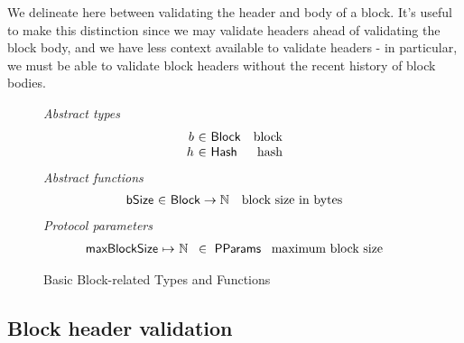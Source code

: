 \documentclass[11pt,a4paper]{article}
\newcommand{\fun}[1]{\mathsf{#1}}
\newcommand{\type}[1]{\mathsf{#1}}
\newcommand{\totalf}{\to}
\newcommand{\partialf}{\mapsto}
\newcommand{\Hash}{\type{Hash}}  %
\newcommand{\Block}{\type{Block}}
\newcommand{\ProtParams}{\type{PParams}} %
\newcommand{\bsizename}{bSize}
\begin{document}
We delineate here between validating the header and body of a block. It's useful
to make this distinction since we may validate headers ahead of validating the
block body, and we have less context available to validate headers - in
particular, we must be able to validate block headers without the recent history
of block bodies.

\begin{figure}[ht]
  \emph{Abstract types}
  \begin{equation*}
    \begin{array}{r@{~\in~}lr}
    b & \Block & \text{block} \\
    h & \Hash   & \text{hash} \\
    \end{array}
  \end{equation*}
  \emph{Abstract functions}
  \begin{equation*}
    \begin{array}{r@{~\in~}lr}
    \fun{\bsizename} & \Block \totalf \mathbb{N} & \text{block size in bytes} \\
    \end{array}
  \end{equation*}
  \emph{Protocol parameters}
  \begin{equation*}
    \begin{array}{r@{~\partialf~}l!{~\in~\ProtParams~}r}
    \maxblocksize & \mathbb{N} & \text{maximum block size} \\
    \end{array}
  \end{equation*}
  \caption{Basic Block-related Types and Functions}
  \label{fig:block-defs}
\end{figure}

\subsection{Block header validation}
\end{document}
